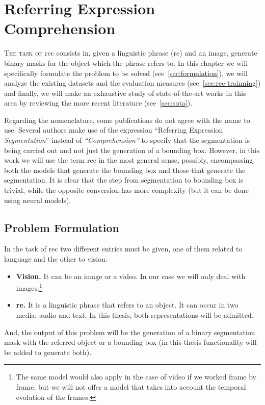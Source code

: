 

\chapter{Referring Expression Comprehension}%
\label{cha:rec}



\lettrine{T}{he task of} \gls{rec} consists in, given a linguistic phrase
(\gls{re}) and an image, generate binary masks for the object which the phrase
refers to. In this chapter we will specifically formulate the problem to be
solved (see\ \vref{sec:formulation}), we will analyze the existing datasets and
the evaluation measures (see\ \vref{sec:rec-trainning}) and finally, we will
make an exhaustive study of state-of-the-art works in this area by reviewing
the more recent literature (see\ \vref{sec:sota}).

Regarding the nomenclature, some publications do not agree with the name to
use. Several authors make use of the expression ``Referring Expression
\textit{Segmentation}'' instead of \textit{``Comprehension''} to specify that
the segmentation is being carried out and not just the generation of a bounding
box. However, in this work we will use the term \gls{rec} in the most general
sense, possibly, encompassing both the models that generate the bounding box
and those that generate the segmentation. It is clear that the step from
segmentation to bounding box is trivial, while the opposite conversion has more
complexity (but it can be done using neural models).



\section{Problem Formulation}\label{sec:formulation}

In the task of \gls{rec} two different entries must be given, one of them
related to language and the other to vision.
\begin{itemize}
  \item \textbf{Vision.} It can be an image or a video. In our case we will
  only deal with images.\footnote{The same model would also apply in the case
    of video if we worked frame by frame, but we will not offer a model that
    takes into account the temporal evolution of the frames.}
  \item \textbf{\gls{re}.} It is a linguistic phrase that refers to an
  object. It can occur in two media: audio and text. In this thesis, both
  representations will be admitted.
\end{itemize}
And, the output of this problem will be the generation of a binary segmentation
mask with the referred object or a bounding box (in this
thesis functionality will be added to generate both).

